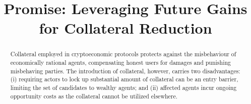 \documentclass[runningheads]{llncs}
\newcommand{\sys}{Promise\xspace}
\begin{document}
\title{
\sys: Leveraging Future Gains for Collateral Reduction
} 
\author{
\institute{}
}


\date{}
\maketitle


\begin{abstract}
Collateral employed in cryptoeconomic protocols protects against the misbehaviour of economically rational agents, compensating honest users for damages and punishing misbehaving parties.
The introduction of collateral, however, carries two disadvantages: (i) requiring actors to lock up substantial amount of collateral can be an entry barrier, limiting the set of candidates to wealthy agents; and (ii) affected agents incur ongoing opportunity costs as the collateral cannot be utilized elsewhere.


\end{abstract}
\end{document}
